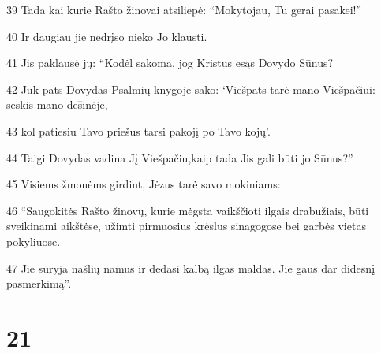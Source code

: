 \par 39 Tada kai kurie Rašto žinovai atsiliepė: “Mokytojau, Tu gerai pasakei!” 
\par 40 Ir daugiau jie nedrįso nieko Jo klausti. 
\par 41 Jis paklausė jų: “Kodėl sakoma, jog Kristus esąs Dovydo Sūnus? 
\par 42 Juk pats Dovydas Psalmių knygoje sako: ‘Viešpats tarė mano Viešpačiui: sėskis mano dešinėje, 
\par 43 kol patiesiu Tavo priešus tarsi pakojį po Tavo kojų’. 
\par 44 Taigi Dovydas vadina Jį Viešpačiu,­kaip tada Jis gali būti jo Sūnus?” 
\par 45 Visiems žmonėms girdint, Jėzus tarė savo mokiniams: 
\par 46 “Saugokitės Rašto žinovų, kurie mėgsta vaikščioti ilgais drabužiais, būti sveikinami aikštėse, užimti pirmuosius krėslus sinagogose bei garbės vietas pokyliuose. 
\par 47 Jie suryja našlių namus ir dedasi kalbą ilgas maldas. Jie gaus dar didesnį pasmerkimą”.



\chapter{21}


